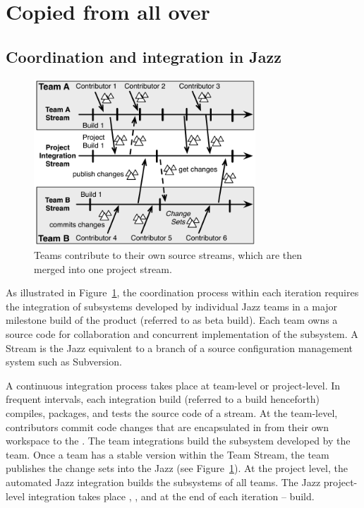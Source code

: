 \pagebreak
\section{Copied from all over}
\subsection{Coordination and integration in Jazz}




\begin{figure}[t]
\begin{center}
\includegraphics[width=8.3cm]{figures/BuildResult}
\caption{Teams contribute to their own source streams, which are then merged into one project stream.}
\label{fig:BuildResult}
\end{center}
\end{figure}


As illustrated in Figure~\ref{fig:BuildResult}, the coordination process within
each iteration requires the integration of subsystems developed by individual
Jazz teams in a major milestone build of the product (referred to as beta build).
Each team owns a source code  for collaboration and concurrent
implementation of the subsystem. A Stream is the Jazz equivalent to a branch of a
source configuration management system such as Subversion.

A continuous integration process takes place at team-level or project-level. In
frequent intervals, each integration build (referred to a build henceforth)
compiles, packages, and tests the source code of a stream. At the team-level,
contributors commit code changes that are encapsulated in  from
their own workspace to the . The team integrations build the
subsystem developed by the team. Once a team has a stable version within the Team
Stream, the team publishes the change sets into the Jazz  (see Figure~\ref{fig:BuildResult}). At the project level, the automated
Jazz integration builds the subsystems of all teams. The Jazz project-level
integration takes place , , and at the end of each
iteration --  build.

